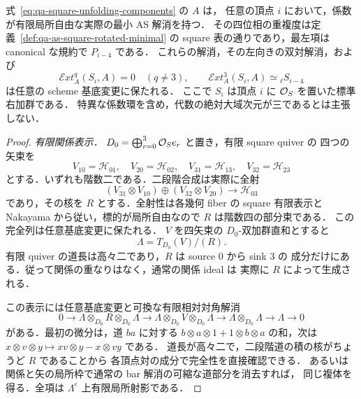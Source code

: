 \begin{proposition}[相対squareの単純解消とAS双対]
\label{prop:qa-relative-square-as-resolutions}
式~\eqref{eq:qa-square-unfolding-components} の $A$ は，
任意の頂点 $i$ において，係数が有限局所自由な実際の最小 AS 解消を持つ．
その四位相の重複度は定義~\ref{def:qa-as-square-rotated-minimal} の
square 表の通りであり，最左項は canonical な規約で $P_{i-4}$ である．
これらの解消，その左向きの双対解消，および
\[
 \mathcal E xt_A^q(S_i,A)=0\quad(q\ne3),
 \qquad
 \mathcal E xt_A^3(S_i,A)\simeq {}_\ell S_{i-4}
 \tag{RAG}\label{eq:qa-square-relative-as-gorenstein}
\]
は任意の scheme 基底変更に保たれる．
ここで $S_i$ は頂点 $i$ に $\mathcal O_S$ を置いた標準右加群である．
特異な係数環を含め，代数の絶対大域次元が三であるとは主張しない．
\end{proposition}
\begin{proof}
\emph{有限関係表示．}
$D_0=\bigoplus_{r=0}^3\mathcal O_Se_r$ と置き，有限 square quiver の
四つの矢束を
\[
 V_{10}=\mathcal H_{01},\quad V_{20}=\mathcal H_{02},\quad
 V_{31}=\mathcal H_{13},\quad V_{32}=\mathcal H_{23}
\]
とする．いずれも階数二である．二段階合成は実際に全射
\[
 (V_{31}\otimes V_{10})\oplus(V_{32}\otimes V_{20})
       \longrightarrow\mathcal H_{03}
\]
であり，その核を $R$ とする．全射性は各幾何 fiber の square 有限表示と
Nakayama から従い，標的が局所自由なので $R$ は階数四の部分束である．
この完全列は任意基底変更に保たれる．
$V$ を四矢束の $D_0$-双加群直和とすると
\[
 \Lambda=T_{D_0}(V)/(R).
\]
有限 quiver の道長は高々二であり，$R$ は source $0$ から sink $3$ の
成分だけにある．従って関係の重なりはなく，通常の関係 ideal は
実際に $R$ によって生成される．

この表示には任意基底変更と可換な有限相対対角解消
\[
 0\longrightarrow\Lambda\otimes_{D_0}R\otimes_{D_0}\Lambda
 \longrightarrow\Lambda\otimes_{D_0}V\otimes_{D_0}\Lambda
 \longrightarrow\Lambda\otimes_{D_0}\Lambda
 \longrightarrow\Lambda\longrightarrow0
 \tag{DR}\label{eq:qa-square-short-diagonal}
\]
がある．最初の微分は，道 $ba$ に対する
$b\otimes a\otimes1+1\otimes b\otimes a$ の和，次は
$x\otimes v\otimes y\mapsto xv\otimes y-x\otimes vy$ である．
道長が高々二で，二段階道の積の核がちょうど $R$ であることから
各頂点対の成分で完全性を直接確認できる．
あるいは関係と矢の局所枠で通常の bar 解消の可縮な道部分を消去すれば，
同じ複体を得る．全項は $\Lambda^e$ 上有限局所射影である．


\end{proof}
